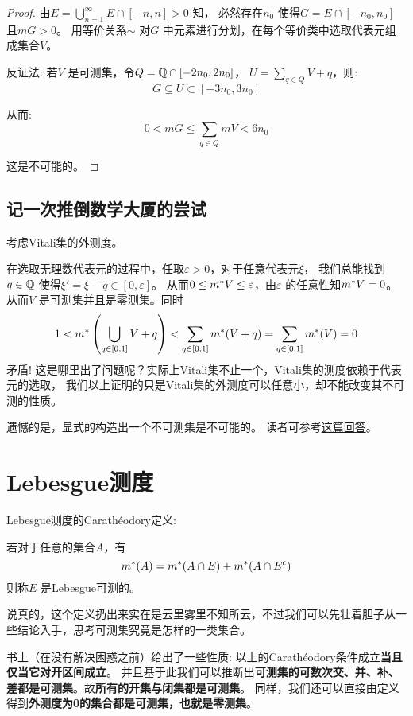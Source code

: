 \begin{proof}
    由\(E= \bigcup_{n=1}^{\infty} E\cap [-n,n]>0\) 知，
    必然存在\(n_{0}\) 使得\(G=E\cap [-n_{0},n_{0}]\) 且\(mG>0\)。
    用等价关系\(\sim\) 对\(G\) 中元素进行分划，在每个等价类中选取代表元组成集合\(V\)。

    反证法: 若\(V\) 是可测集，令\(Q=\mathbb{Q}\cap[-2n_{0},2n_{0}]\)，
    \(U=\sum_{q\in Q} V+q\)，则:
    \[
        G \subseteq U \subset [-3n_{0},3n_{0}]
    \]

    从而: \[
        0<m G\leq \sum_{q\in Q} mV<6n_{0}
    \]

    这是不可能的。
\end{proof}

\subsection{记一次推倒数学大厦的尝试}
考虑Vitali集的外测度。

在选取无理数代表元的过程中，任取\(\varepsilon>0\)，对于任意代表元\(\xi\)，
我们总能找到\(q \in \mathbb{Q}\) 使得\(\xi'=\xi-q \in [0,\varepsilon]\)。
从而\(0\leq m^{*} V\leq \varepsilon\)，由\(\varepsilon\)
的任意性知\(m^{*} V=0\)。从而\(V\) 是可测集并且是零测集。同时\[
    1<m^{*}\left( \bigcup_{q\in [0,1]} V+q  \right) < \sum_{q
    \in [0,1]} m^{*}(V+q) = \sum_{q\in [0,1]} m^{*}(V) = 0
\]
矛盾!
这是哪里出了问题呢？实际上Vitali集不止一个，Vitali集的测度依赖于代表元的选取，
我们以上证明的只是Vitali集的外测度可以任意小，却不能改变其不可测的性质。

遗憾的是，显式的构造出一个不可测集是不可能的。
读者可参考\href{https://math.stackexchange.com/questions/226559/examples-of-non-measurable-sets-in-mathbbr}{这篇回答}。

\section{Lebesgue测度}
Lebesgue测度的Carathéodory定义:
\begin{definition}
    若对于任意的集合\(A\)，有
    \[
        m^{*}(A)=m^{*}(A\cap E)+m^{*}(A\cap E^{c})
    \]
    则称\(E\) 是Lebesgue可测的。
\end{definition}

说真的，这个定义扔出来实在是云里雾里不知所云，不过我们可以先壮着胆子从一些结论入手，思考可测集究竟是怎样的一类集合。

书上（在没有解决困惑之前）给出了一些性质: 以上的Carathéodory条件成立\textbf{当且仅当它对开区间成立}。
并且基于此我们可以推断出\textbf{可测集的可数次交、并、补、差都是可测集}。故\textbf{所有的开集与闭集都是可测集}。
同样，我们还可以直接由定义得到\textbf{外测度为0的集合都是可测集，也就是零测集}。

